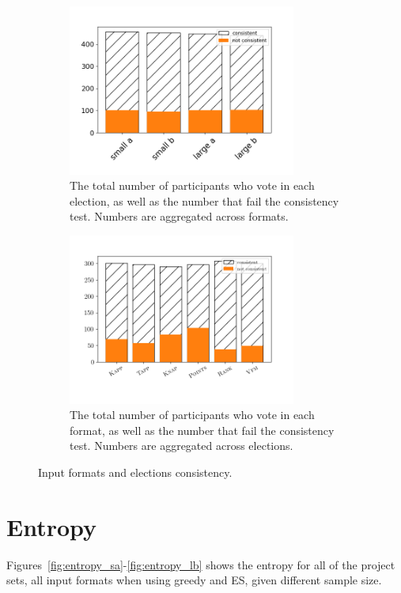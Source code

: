 \documentclass[letterpaper]{article} %
\newcommand{\mes}{ES}
\begin{document}
\begin{figure}[ht!]
     \centering
          \begin{subfigure}[b]{0.45\textwidth}
         \centering
       \includegraphics[width=7.5cm]{experiment/election_consistency.png}
\caption{The total number of  participants who vote in each election, as well as the number that fail the consistency test.  Numbers are aggregated across formats.
}\label{fig:consistency_elections}
     \end{subfigure}\hfill
     \begin{subfigure}[b]{0.45\textwidth}
         \centering
         \includegraphics[width=7.5cm]{experiment/format_consistency.png}
\caption{The total number of  participants who vote in each format, as well as the number that fail the consistency test.  Numbers are aggregated across elections.
}\label{fig:consistency}
     \end{subfigure}
        \caption{Input formats and elections consistency.}
        \label{fig:all_consistency}
\end{figure}


\section{Entropy}\label{app:entropy}
Figures~\ref{fig:entropy_sa}-\ref{fig:entropy_lb}  shows the entropy for all of the project sets, all input formats when using greedy and \mes{}, given different sample size. 
\end{document}
